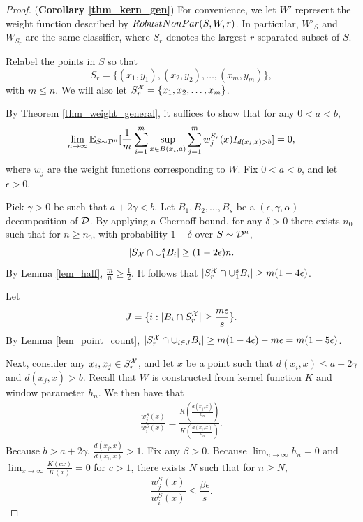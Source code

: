 \begin{proof}(\textbf{Corollary \ref{thm_kern_gen}})
For convenience, we let $W'$ represent the weight function described by $RobustNonPar(S,W, r)$. In particular, $W'_S$ and $W_{S_r}$ are the same classifier, where $S_r$ denotes the largest $r$-separated subset of $S$.

Relabel the points in $S$ so that $$S_r = \{(x_1, y_1), (x_2, y_2), \dots, (x_m, y_m)\},$$ with $ m \leq n$. We will also let $S_r^\mathcal X = \{x_1, x_2, \dots, x_m\}$. 

By Theorem \ref{thm_weight_general}, it suffices to show that for any $0 < a < b$, $$\lim_{n \to \infty}\mathbb{E}_{S \sim {\mathcal D}^n} [\frac{1}{m} \sum_{i=1}^{m}\sup_{x \in B(x_i,a)} \sum_{j=1}^{m} w_j^{S_r}(x)I_{d(x_i, x) > b}] = 0,$$ where $w_j$ are the weight functions corresponding to $W$. Fix $0 < a < b$, and let $\epsilon > 0$. 

Pick $\gamma > 0$ be such that $a+ 2\gamma < b$. Let $B_1, B_2, \dots, B_s$ be a $(\epsilon, \gamma, \alpha)$ decomposition of ${\mathcal D}$. By applying a Chernoff bound, for any $\delta > 0$ there exists $n_0$ such that for $n \geq n_0$, with probability $1-\delta$ over $S \sim {\mathcal D}^n$, $$|S_\mathcal X \cap \cup_1^s B_i| \geq (1-2\epsilon)n.$$  By Lemma \ref{lem_half}, $\frac{m}{n} \geq \frac{1}{2}$. It follows that $|S_r^\mathcal X \cap \cup_1^s B_i| \geq m(1-4\epsilon)$. 

Let $$J = \{i: |B_i \cap S_r^\mathcal X| \geq \frac{m\epsilon}{s}\}.$$ By Lemma \ref{lem_point_count}, $|S_r^\mathcal X \cap \cup_{i \in J} B_i| \geq m(1 - 4\epsilon) - m\epsilon = m(1 - 5\epsilon)$.

Next, consider any $x_i, x_j \in S_r^\mathcal X$, and let $x$ be a point such that $d(x_i, x) \leq a+2\gamma$ and $d(x_j, x) > b$. Recall that $W$ is constructed from kernel function $K$ and window parameter $h_n$. We then have that 
\begin{equation}\label{eqn_kern_ratio}
\begin{split}
\frac{w_j^S(x)}{w_i^S(x)} = \frac{K(\frac{d(x_j, x)}{h_n})}{K(\frac{d(x_i, x)}{h_n})}.
\end{split}
\end{equation}
Because $b > a + 2\gamma$, $\frac{d(x_j, x)}{d(x_i, x)} > 1$. Fix any $\beta > 0$. Because $\lim_{n \to \infty} h_n = 0$ and $\lim_{x \to \infty} \frac{K(cx)}{K(x)} = 0$ for $c > 1$, there exists $N$ such that for $n \geq N$, $$\frac{w_j^S(x)}{w_i^S(x)} \leq \frac{\beta\epsilon}{s}.$$ 


\end{proof}
